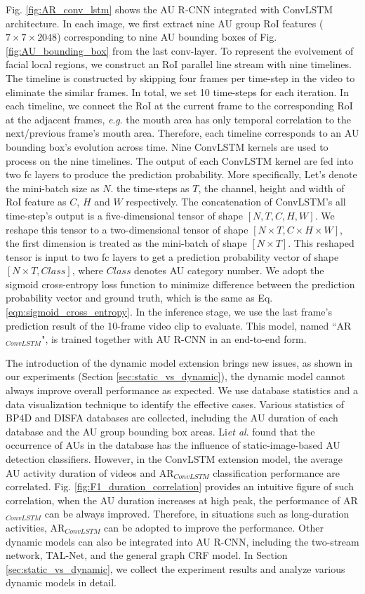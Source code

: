 \documentclass[5p,twocolumn]{elsarticle}
\newcommand{\etal}{\textit{et al}. }
\newcommand{\eg}{\textit{e}.\textit{g}. }
\begin{document}
Fig. \ref{fig:AR_conv_lstm} shows the AU R-CNN integrated with ConvLSTM architecture. In each image, we first extract nine AU group RoI features ($7\times 7\times 2048$) corresponding to nine AU bounding boxes of Fig. \ref{fig:AU_bounding_box} from the last conv-layer. To represent the evolvement of facial local regions, we construct an RoI parallel line stream with nine timelines. The timeline is constructed by skipping four frames per time-step in the video to eliminate the similar frames.  In total, we set 10 time-steps for each iteration. In each timeline, we connect the RoI at the current frame to the corresponding RoI at the adjacent frames, \eg the mouth area has only temporal correlation to the next/previous frame's mouth area. Therefore, each timeline corresponds to an AU bounding box's evolution across time. Nine ConvLSTM kernels are used to process on the nine timelines. The output of each ConvLSTM kernel are fed into two fc layers to produce the prediction probability. More specifically, Let's denote the mini-batch size as $N$. the time-steps as $T$, the channel, height and width of RoI feature as $C$, $H$ and $W$ respectively. The concatenation of ConvLSTM's all time-step's output is a five-dimensional tensor of shape $[N, T, C, H, W]$. We reshape this tensor to a two-dimensional tensor of shape $[N \times T, C \times H \times W]$, the first dimension is treated as the mini-batch of shape $[N\times T]$. This reshaped tensor is input to two fc layers to get a prediction probability vector of shape $[N \times T, Class]$, where $Class$ denotes AU category number.
We adopt the sigmoid cross-entropy loss function to minimize difference between the prediction probability vector and ground truth, which is the same as Eq. \ref{eqn:sigmoid_cross_entropy}. In the inference stage, we use the last frame's prediction result of the 10-frame video clip to evaluate. This model, named ``AR$_{ConvLSTM}$", is trained together with AU R-CNN in an end-to-end form. 

The introduction of the dynamic model extension brings new issues, as shown in our experiments (Section \ref{sec:static_vs_dynamic}), the dynamic model cannot always improve overall performance as expected. We use database statistics and a data visualization technique to identify the effective cases. Various statistics of BP4D and DISFA databases are collected, including the AU duration of each database and the AU group bounding box areas. Li\etal \cite{li2017eac} found that the occurrence of AUs in the database has the influence of static-image-based AU detection classifiers. However, in the ConvLSTM extension model, the average AU activity duration of videos and AR$_{ConvLSTM}$ classification performance are correlated. Fig. \ref{fig:F1_duration_correlation} provides an intuitive figure of such correlation, when the AU duration increases at high peak, the performance of AR$_{ConvLSTM}$ can be always improved. Therefore, in situations such as long-duration activities, AR$_{ConvLSTM}$ can be adopted to improve the performance. Other dynamic models can also be integrated into AU R-CNN, including the two-stream network, TAL-Net, and the general graph CRF model. In Section  \ref{sec:static_vs_dynamic}, we collect the experiment results and analyze various dynamic models in detail. 
\end{document}
